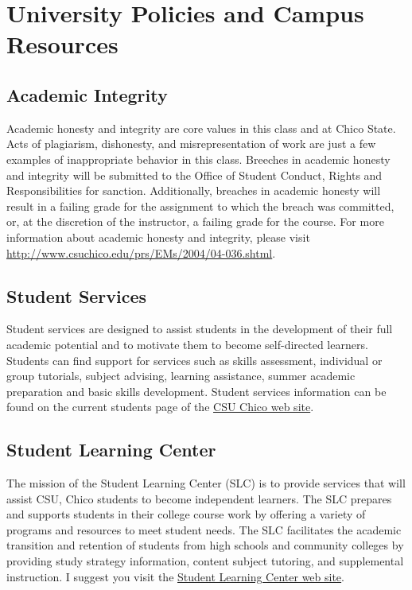 \documentclass[11pt,]{article}
\begin{document}
\hypertarget{university-policies-and-campus-resources}{%
\section{University Policies and Campus
Resources}\label{university-policies-and-campus-resources}}

\hypertarget{academic-integrity}{%
\subsection{Academic Integrity}\label{academic-integrity}}

Academic honesty and integrity are core values in this class and at
Chico State. Acts of plagiarism, dishonesty, and misrepresentation of
work are just a few examples of inappropriate behavior in this class.
Breeches in academic honesty and integrity will be submitted to the
Office of Student Conduct, Rights and Responsibilities for sanction.
Additionally, breaches in academic honesty will result in a failing
grade for the assignment to which the breach was committed, or, at the
discretion of the instructor, a failing grade for the course. For more
information about academic honesty and integrity, please visit
\url{http://www.csuchico.edu/prs/EMs/2004/04-036.shtml}.

\hypertarget{student-services}{%
\subsection{Student Services}\label{student-services}}

Student services are designed to assist students in the development of
their full academic potential and to motivate them to become
self-directed learners. Students can find support for services such as
skills assessment, individual or group tutorials, subject advising,
learning assistance, summer academic preparation and basic skills
development. Student services information can be found on the current
students page of the \href{https://www.csuchico.edu/sa/}{CSU Chico web
site}.

\hypertarget{student-learning-center}{%
\subsection{Student Learning Center}\label{student-learning-center}}

The mission of the Student Learning Center (SLC) is to provide services
that will assist CSU, Chico students to become independent learners. The
SLC prepares and supports students in their college course work by
offering a variety of programs and resources to meet student needs. The
SLC facilitates the academic transition and retention of students from
high schools and community colleges by providing study strategy
information, content subject tutoring, and supplemental instruction. I
suggest you visit the \href{https://www.csuchico.edu/slc/}{Student
Learning Center web site}.
\end{document}
